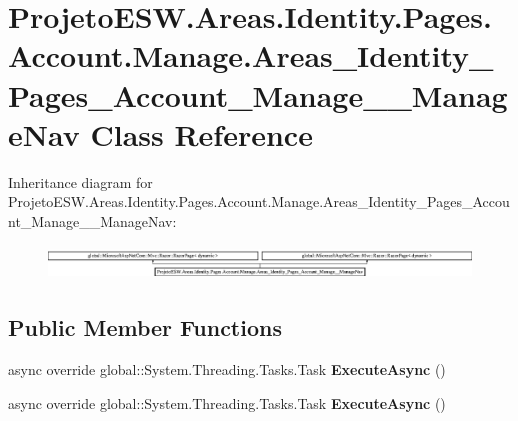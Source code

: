 \hypertarget{class_projeto_e_s_w_1_1_areas_1_1_identity_1_1_pages_1_1_account_1_1_manage_1_1_areas___identity9df048355e46256b00c921251d1ec8a1}{}\section{Projeto\+E\+S\+W.\+Areas.\+Identity.\+Pages.\+Account.\+Manage.\+Areas\+\_\+\+Identity\+\_\+\+Pages\+\_\+\+Account\+\_\+\+Manage\+\_\+\+\_\+\+Manage\+Nav Class Reference}
\label{class_projeto_e_s_w_1_1_areas_1_1_identity_1_1_pages_1_1_account_1_1_manage_1_1_areas___identity9df048355e46256b00c921251d1ec8a1}
Inheritance diagram for Projeto\+E\+S\+W.\+Areas.\+Identity.\+Pages.\+Account.\+Manage.\+Areas\+\_\+\+Identity\+\_\+\+Pages\+\_\+\+Account\+\_\+\+Manage\+\_\+\+\_\+\+Manage\+Nav\+:\begin{figure}[H]
\begin{center}
\leavevmode
\includegraphics[height=0.894569cm]{class_projeto_e_s_w_1_1_areas_1_1_identity_1_1_pages_1_1_account_1_1_manage_1_1_areas___identity9df048355e46256b00c921251d1ec8a1}
\end{center}
\end{figure}
\subsection*{Public Member Functions}
\begin{DoxyCompactItemize}
\item 
\mbox{\label{class_projeto_e_s_w_1_1_areas_1_1_identity_1_1_pages_1_1_account_1_1_manage_1_1_areas___identity9df048355e46256b00c921251d1ec8a1_a169a6e7df3e767044a58e5d119bc4a1a}} 
async override global\+::\+System.\+Threading.\+Tasks.\+Task {\bfseries Execute\+Async} ()
\item 
\mbox{\label{class_projeto_e_s_w_1_1_areas_1_1_identity_1_1_pages_1_1_account_1_1_manage_1_1_areas___identity9df048355e46256b00c921251d1ec8a1_a169a6e7df3e767044a58e5d119bc4a1a}} 
async override global\+::\+System.\+Threading.\+Tasks.\+Task {\bfseries Execute\+Async} ()
\end{DoxyCompactItemize}
